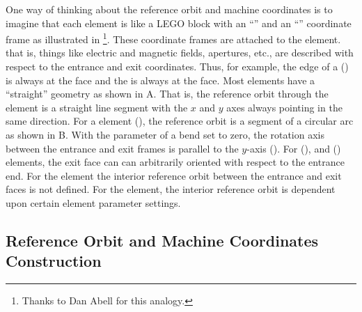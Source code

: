 One way of thinking about the reference orbit and machine coordinates is to imagine that each
element is like a LEGO block with an ``'' and an ``'' coordinate frame as
illustrated in \footnote
  {
Thanks to Dan Abell for this analogy.
  }. 
These coordinate frames are attached to the element. that is, things like electric and magnetic
fields, apertures, etc., are described with respect to the entrance and exit coordinates.  Thus, for
example, the  edge of a  () is always at the  face and the
 is always at the  face. Most elements have a ``straight'' geometry as shown in
A. That is, the reference orbit through the element is a straight line
segment with the $x$ and $y$ axes always pointing in the same direction.  For a  element
(), the reference orbit is a segment of a circular arc as shown in
B. With the  parameter of a bend set to zero, the rotation axis
between the entrance and exit frames is parallel to the $y$-axis (). For 
(), and  () elements, the exit face can can
arbitrarily oriented with respect to the entrance end. For the  element the
interior reference orbit between the
entrance and exit faces is not defined. For the  element, the interior reference orbit 
is dependent upon certain  element parameter settings.

\subsection{Reference Orbit and Machine Coordinates Construction}
\label{s:ref.construct}

